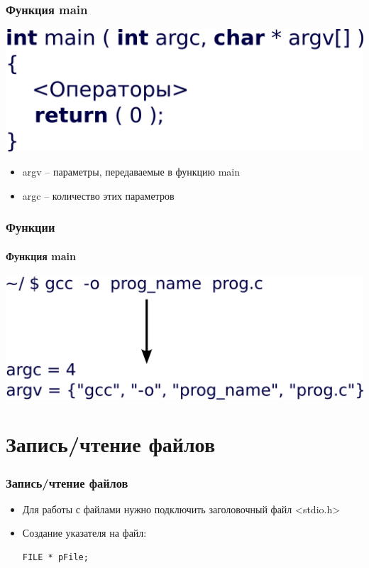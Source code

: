 \documentclass[12pt,pdf,hyperref={unicode}]{beamer}
\begin{document}
\begin{frame}[fragile]
\frametitle{Функция main}  
\begin{center}
\includegraphics[width=0.7\linewidth]{images/function_syntax_main_args.png}
\end{center}
\begin{itemize}
\item argv -- параметры, передаваемые в функцию main
\item argc -- количество этих параметров
\end{itemize}
\end{frame}

\begin{frame}[fragile]
\frametitle{Функции} 
\framesubtitle{Функция main}
\begin{center}
\includegraphics[width=1.0\linewidth]{images/function_argcargv.png}
\end{center}
\end{frame}




\section{Запись/чтение файлов}

\begin{frame}[fragile]
\frametitle{Запись/чтение файлов} 
\begin{itemize}
\item Для работы с файлами нужно подключить заголовочный файл <stdio.h>
\item Создание указателя на файл:
\begin{lstlisting}
FILE * pFile;
\end{lstlisting}
\end{itemize}
\end{frame}
\end{document}
